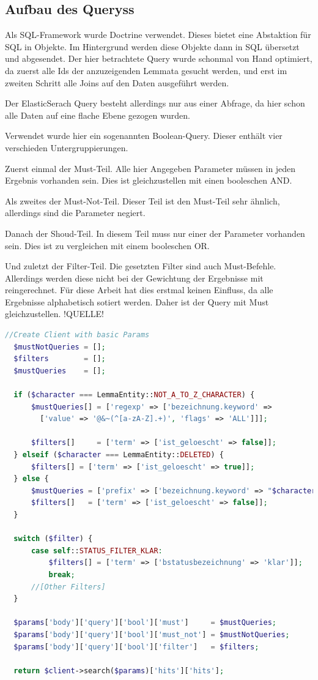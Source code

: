 \subsection{Aufbau des Queryss}

Als SQL-Framework wurde Doctrine verwendet. Dieses bietet eine Abstaktion für SQL in Objekte. Im Hintergrund werden diese Objekte dann in SQL übersetzt und abgesendet. Der hier betrachtete Query wurde schonmal von Hand optimiert, da zuerst alle Ids der anzuzeigenden Lemmata gesucht werden, und erst im zweiten Schritt alle Joins auf den Daten ausgeführt werden.

Der ElasticSerach Query besteht allerdings nur aus einer Abfrage, da hier schon alle Daten auf eine flache Ebene gezogen wurden.

Verwendet wurde hier ein sogenannten Boolean-Query. Dieser enthält vier verschieden Untergruppierungen.

Zuerst einmal der Must-Teil. Alle hier Angegeben Parameter müssen in jeden Ergebnis vorhanden sein. Dies ist gleichzustellen mit einen booleschen AND. 

Als zweites der Must-Not-Teil. Dieser Teil ist den Must-Teil sehr ähnlich, allerdings sind die Parameter negiert.

Danach der Shoud-Teil. In diesem Teil muss nur einer der Parameter vorhanden sein. Dies ist zu vergleichen mit einem booleschen OR. 

Und zuletzt der Filter-Teil. Die gesetzten Filter sind auch Must-Befehle. Allerdings werden diese nicht bei der Gewichtung der Ergebnisse mit reingerechnet. Für diese Arbeit hat dies erstmal keinen Einfluss, da alle Ergebnisse alphabetisch sotiert werden. Daher ist der Query mit Must gleichzustellen. !QUELLE!


\begin{lstlisting}[language=PHP, frame=single, label={lst:queryEla}] 
  //Create Client with basic Params
  $mustNotQueries = [];
  $filters        = [];
  $mustQueries    = [];

  if ($character === LemmaEntity::NOT_A_TO_Z_CHARACTER) {
      $mustQueries[] = ['regexp' => ['bezeichnung.keyword' => 
        ['value' => '@&~(^[a-zA-Z].+)', 'flags' => 'ALL']]];
        
      $filters[]     = ['term' => ['ist_geloescht' => false]];
  } elseif ($character === LemmaEntity::DELETED) {
      $filters[] = ['term' => ['ist_geloescht' => true]];
  } else {
      $mustQueries = ['prefix' => ['bezeichnung.keyword' => "$character"]];
      $filters[]   = ['term' => ['ist_geloescht' => false]];
  }

  switch ($filter) {
      case self::STATUS_FILTER_KLAR:
          $filters[] = ['term' => ['bstatusbezeichnung' => 'klar']];
          break;
      //[Other Filters]
  }

  $params['body']['query']['bool']['must']     = $mustQueries;
  $params['body']['query']['bool']['must_not'] = $mustNotQueries;
  $params['body']['query']['bool']['filter']   = $filters;

  return $client->search($params)['hits']['hits'];
  
\end{lstlisting}

